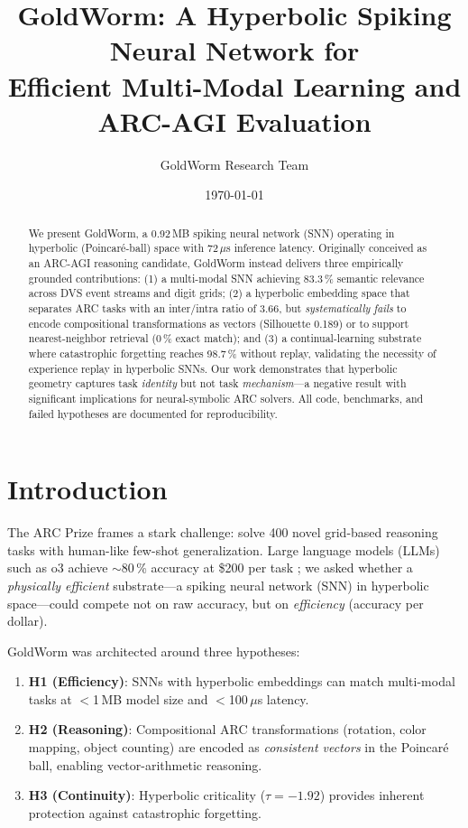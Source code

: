 \documentclass[11pt,a4paper]{article}
\title{\textbf{GoldWorm}: A Hyperbolic Spiking Neural Network for\\Efficient Multi-Modal Learning and ARC-AGI Evaluation}
\author{GoldWorm Research Team}
\date{\today}
\begin{document}
\maketitle

\begin{abstract}
\noindent
We present GoldWorm, a 0.92\,MB spiking neural network (SNN) operating in hyperbolic (Poincaré-ball) space with 72\,$\mu$s inference latency. Originally conceived as an ARC-AGI reasoning candidate, GoldWorm instead delivers three empirically grounded contributions: (1) a multi-modal SNN achieving 83.3\,\% semantic relevance across DVS event streams and digit grids; (2) a hyperbolic embedding space that separates ARC tasks with an inter/intra ratio of 3.66, but \emph{systematically fails} to encode compositional transformations as vectors (Silhouette 0.189) or to support nearest-neighbor retrieval (0\,\% exact match); and (3) a continual-learning substrate where catastrophic forgetting reaches 98.7\,\% without replay, validating the necessity of experience replay in hyperbolic SNNs. Our work demonstrates that hyperbolic geometry captures task \emph{identity} but not task \emph{mechanism}---a negative result with significant implications for neural-symbolic ARC solvers. All code, benchmarks, and failed hypotheses are documented for reproducibility.
\end{abstract}

\section{Introduction}
\label{sec:intro}

The ARC Prize \cite{arc_prize} frames a stark challenge: solve 400 novel grid-based reasoning tasks with human-like few-shot generalization. Large language models (LLMs) such as o3 achieve $\sim$80\,\% accuracy at \$200 per task \cite{o3_arc}; we asked whether a \emph{physically efficient} substrate---a spiking neural network (SNN) in hyperbolic space---could compete not on raw accuracy, but on \emph{efficiency} (accuracy per dollar).

GoldWorm was architected around three hypotheses:
\begin{enumerate}
    \item \textbf{H1 (Efficiency)}: SNNs with hyperbolic embeddings can match multi-modal tasks at $<$1\,MB model size and $<$100\,$\mu$s latency.
    \item \textbf{H2 (Reasoning)}: Compositional ARC transformations (rotation, color mapping, object counting) are encoded as \emph{consistent vectors} in the Poincaré ball, enabling vector-arithmetic reasoning.
    \item \textbf{H3 (Continuity)}: Hyperbolic criticality ($\tau = -1.92$) provides inherent protection against catastrophic forgetting.
\end{enumerate}
\end{document}
